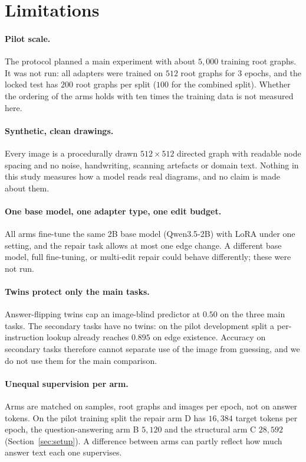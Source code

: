 \section{Limitations}
\label{sec:limitations}

\paragraph{Pilot scale.}
The protocol planned a main experiment with about $5{,}000$ training root graphs. It was not
run: all adapters were trained on $512$ root graphs for $3$ epochs, and the locked test has
$200$ root graphs per split ($100$ for the combined split). Whether the ordering of the arms
holds with ten times the training data is not measured here.

\paragraph{Synthetic, clean drawings.}
Every image is a procedurally drawn $512 \times 512$ directed graph with readable node
spacing and no noise, handwriting, scanning artefacts or domain text. Nothing in this study
measures how a model reads real diagrams, and no claim is made about them.

\paragraph{One base model, one adapter type, one edit budget.}
All arms fine-tune the same 2B base model (Qwen3.5-2B) with LoRA under one setting, and the
repair task allows at most one edge change. A different base model, full fine-tuning, or
multi-edit repair could behave differently; these were not run.

\paragraph{Twins protect only the main tasks.}
Answer-flipping twins cap an image-blind predictor at $0.50$ on the three main tasks. The
secondary tasks have no twins: on the pilot development split a per-instruction lookup
already reaches $0.895$ on edge existence. Accuracy on secondary tasks therefore cannot
separate use of the image from guessing, and we do not use them for the main comparison.

\paragraph{Unequal supervision per arm.}
Arms are matched on samples, root graphs and images per epoch, not on answer tokens. On the
pilot training split the repair arm D has $16{,}384$ target tokens per epoch, the
question-answering arm B $5{,}120$ and the structural arm C $28{,}592$
(Section~\ref{sec:setup}). A difference between arms can partly reflect how much answer
text each one supervises.

